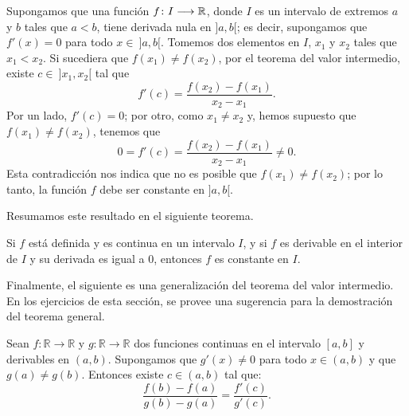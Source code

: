Supongamos que una función $f\colon I\longrightarrow \mathbb{R}$, donde $I$ es un intervalo de extremos $a$ y $b$
tales que $a < b$, tiene derivada nula en $]a,b[$; es decir, supongamos que $f'(x) = 0$ para todo
$x\in\ ]a,b[$. Tomemos dos elementos en $I$, $x_1$ y $x_2$ tales que $x_1 < x_2$. Si sucediera que
$f(x_1) \neq f(x_2)$, por el teorema del valor intermedio, existe $c\in\ ]x_1,x_2[$ tal que
\[
f'(c) = \frac{f(x_2) - f(x_1)}{x_2 - x_1}.
\]
Por un lado, $f'(c) = 0$; por otro, como $x_1 \neq x_2$ y, hemos supuesto que $f(x_1)\neq f(x_2)$,
tenemos que
\[
0 = f'(c) = \frac{f(x_2) - f(x_1)}{x_2 - x_1} \neq 0.
\]
Esta contradicción nos indica que no es posible que $f(x_1) \neq f(x_2)$; por lo tanto, la función
$f$ debe ser constante en $]a,b[$.

Resumamos este resultado en el siguiente teorema.

\begin{teocal}\label{teo:daDerivadaCero}
Si $f$ está definida y es continua en un intervalo $I$, y si $f$ es derivable en el interior de $I$ y su derivada es igual a $0$, entonces $f$ es constante en $I$.
\end{teocal}

Finalmente, el siguiente es una generalización del teorema del valor intermedio. En los ejercicios
de esta sección, se provee una sugerencia para la demostración del teorema general.

\begin{teocal}
Sean $f\colon \mathbb{R} \rightarrow  \mathbb{R}$ y $g\colon \mathbb{R} \rightarrow  \mathbb{R}$
dos funciones continuas en el intervalo $[a,b]$ y derivables en $(a,b)$. Supongamos que $g'(x)\neq
0$ para todo $x\in (a,b)$ y que $g(a)\neq g(b)$. Entonces existe $c\in (a,b)$ tal que:
\begin{equation*}
	 \frac{f(b)-f(a)}{g(b)-g(a)}=\frac{f'(c)}{g'(c)}.
\end{equation*}
\end{teocal}

